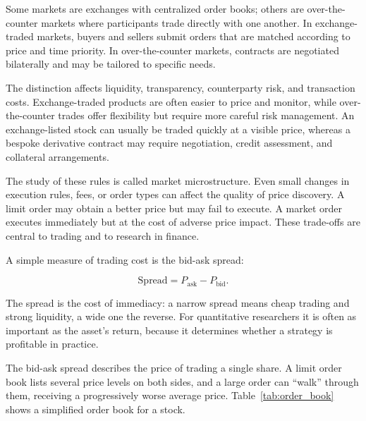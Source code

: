 \documentclass[../ai_in_finance]{subfiles}
\begin{document}
Some markets are exchanges with centralized order books; others are over-the-counter markets where participants trade directly with one another. In exchange-traded markets, buyers and sellers submit orders that are matched according to price and time priority. In over-the-counter markets, contracts are negotiated bilaterally and may be tailored to specific needs.

The distinction affects liquidity, transparency, counterparty risk, and transaction costs. Exchange-traded products are often easier to price and monitor, while over-the-counter trades offer flexibility but require more careful risk management. An exchange-listed stock can usually be traded quickly at a visible price, whereas a bespoke derivative contract may require negotiation, credit assessment, and collateral arrangements.

The study of these rules is called market microstructure. Even small changes in execution rules, fees, or order types can affect the quality of price discovery. A limit order may obtain a better price but may fail to execute. A market order executes immediately but at the cost of adverse price impact. These trade-offs are central to trading and to research in finance.

A simple measure of trading cost is the bid-ask spread:

\begin{equation}
\text{Spread} = P_{\text{ask}} - P_{\text{bid}}.\label{eq:markets-spread}
\end{equation}

The spread is the cost of immediacy: a narrow spread means cheap trading and strong liquidity, a wide one the reverse. For quantitative researchers it is often as important as the asset's return, because it determines whether a strategy is profitable in practice.

\label{sec:order-book-example}

The bid-ask spread describes the price of trading a single share. A limit order book lists several price levels on both sides, and a large order can ``walk'' through them, receiving a progressively worse average price. Table~\ref{tab:order_book} shows a simplified order book for a stock.
\end{document}
